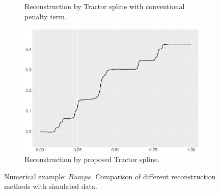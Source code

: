 \begin{figure}
\begin{subfigure}{0.45\textwidth}
    \caption{Reconstruction by Tractor spline with conventional penalty term.}
    \end{subfigure}
    \begin{subfigure}{0.45\textwidth}
    \centering
    \includegraphics[width=\linewidth,height=0.45\textwidth]{Chapters/02TractorSplineTheory/plot/ggplot/ggBumpsTractor.pdf}
    \caption{Reconstruction by proposed Tractor spline.}
    \end{subfigure}
\caption{Numerical example: $\textit{Bumps}$. Comparison of different reconstruction methods with simulated data.}\label{num2}
 \end{figure}






